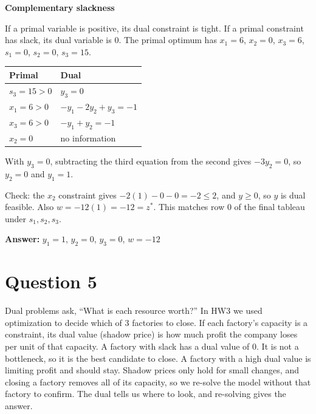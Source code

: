 \documentclass{article}
\begin{document}
\textbf{Complementary slackness}

If a primal variable is positive, its dual constraint is tight. If a primal constraint has slack, its dual variable is 0. The primal optimum has $x_1 = 6$, $x_2 = 0$, $x_3 = 6$, $s_1 = 0$, $s_2 = 0$, $s_3 = 15$.

\begin{center}
\begin{tabular}{ll}
\toprule
Primal & Dual \\
\midrule
$s_3 = 15 > 0$ & $y_3 = 0$ \\
$x_1 = 6 > 0$ & $-y_1 - 2y_2 + y_3 = -1$ \\
$x_3 = 6 > 0$ & $-y_1 + y_2 = -1$ \\
$x_2 = 0$ & no information \\
\bottomrule
\end{tabular}
\end{center}

With $y_3 = 0$, subtracting the third equation from the second gives $-3y_2 = 0$, so $y_2 = 0$ and $y_1 = 1$.

Check: the $x_2$ constraint gives $-2(1) - 0 - 0 = -2 \le 2$, and $y \ge 0$, so $y$ is dual feasible. Also $w = -12(1) = -12 = z^*$. This matches row 0 of the final tableau under $s_1, s_2, s_3$.

\textbf{Answer:} $y_1 = 1$, $y_2 = 0$, $y_3 = 0$, $w = -12$

\section*{Question 5}
Dual problems ask, ``What is each resource worth?'' In HW3 we used optimization to decide which of 3 factories to close. If each factory's capacity is a constraint, its dual value (shadow price) is how much profit the company loses per unit of that capacity. A factory with slack has a dual value of 0. It is not a bottleneck, so it is the best candidate to close. A factory with a high dual value is limiting profit and should stay. Shadow prices only hold for small changes, and closing a factory removes all of its capacity, so we re-solve the model without that factory to confirm. The dual tells us where to look, and re-solving gives the answer.
\end{document}
